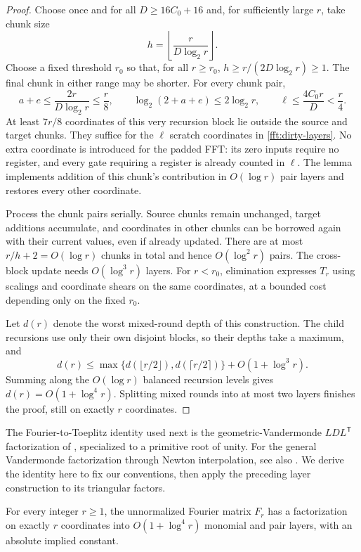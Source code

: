 \begin{proof}
Choose once and for all $D\ge16C_0+16$ and, for sufficiently large
$r$, take chunk size
\[
 h=\left\lfloor\frac{r}{D\log_2r}\right\rfloor.
\]
Choose a fixed threshold $r_0$ so that, for all $r\ge r_0$,
$h\ge r/(2D\log_2r)\ge1$.  The final chunk in either range may be
shorter.  For every chunk pair,
\[
 a+e\le\frac{2r}{D\log_2r}\le\frac r8,
 \qquad
 \log_2(2+a+e)\le2\log_2r,
 \qquad
 \ell\le\frac{4C_0r}{D}<\frac r4.
\]
At least $7r/8$ coordinates of this very recursion block lie outside
the source and target chunks.  They suffice for the $\ell$ scratch
coordinates in \cref{fft:dirty-layers}.  No extra coordinate is
introduced for the padded FFT: its zero inputs require no register,
and every gate requiring a register is already counted in $\ell$.
The lemma implements addition of this chunk's contribution in
$O(\log r)$ pair layers and restores every other coordinate.

Process the chunk pairs serially.  Source chunks remain unchanged,
target additions accumulate, and coordinates in other chunks can be
borrowed again with their current values, even if already updated.
There are at most $r/h+2=O(\log r)$ chunks in total and hence
$O(\log^2r)$ pairs.  The cross-block update needs
$O(\log^3r)$ layers.  For $r<r_0$, elimination expresses $T_r$ using
scalings and coordinate shears on the same coordinates, at a bounded
cost depending only on the fixed $r_0$.

Let $d(r)$ denote the worst mixed-round depth of this construction.
The child recursions use only their own disjoint blocks, so their
depths take a maximum, and
\[
 d(r)\le\max\{d(\lfloor r/2\rfloor),
                  d(\lceil r/2\rceil)\}
             +O(1+\log^3r).
\]
Summing along the $O(\log r)$ balanced recursion levels gives
$d(r)=O(1+\log^4r)$.  Splitting mixed rounds into at most two layers
finishes the proof, still on exactly $r$ coordinates.
\end{proof}

The Fourier-to-Toeplitz identity used next is the geometric-Vandermonde
$LDL^{\mathsf T}$ factorization of \citet[Theorem~1]{kuznetsov2018},
specialized to a primitive root of unity. For the general Vandermonde
factorization through Newton interpolation, see also
\citet[Theorem~2.1]{orucPhillips2000}. We derive the identity here to fix
our conventions, then apply the preceding layer construction to its
triangular factors.

\begin{lemma}\label{lem:fourier-layers}
For every integer $r\ge1$, the unnormalized Fourier matrix $F_r$ has
a factorization on exactly $r$ coordinates into
$O(1+\log^4r)$ monomial and pair layers, with an absolute implied
constant.
\end{lemma}

